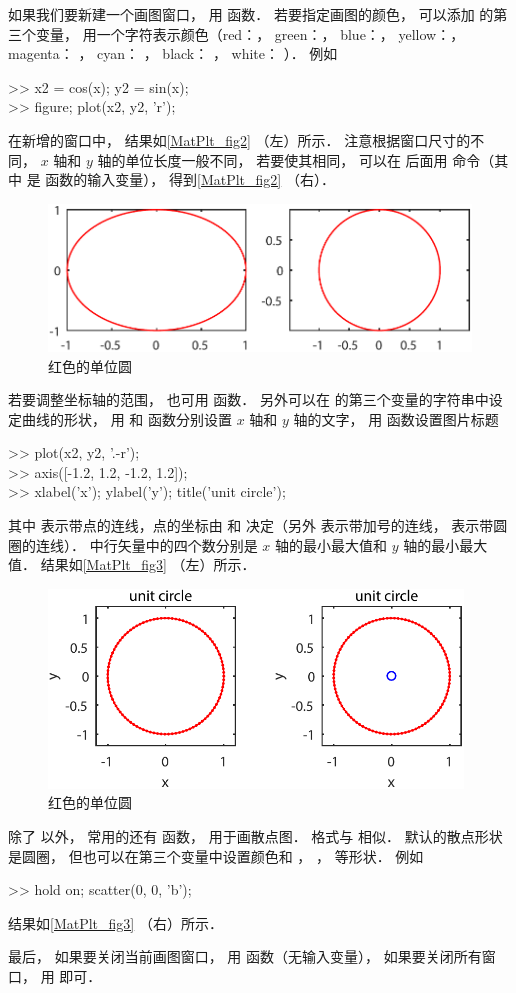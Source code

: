 如果我们要新建一个画图窗口， 用  函数． 若要指定画图的颜色， 可以添加  的第三个变量， 用一个字符表示颜色（red：， green：， blue：， yellow：， magenta： ， cyan： ， black： ， white： ）． 例如
\begin{Command}
>> x2 = cos(x); y2 = sin(x);\\
>> figure; plot(x2, y2, 'r');
\end{Command}
在新增的窗口中， 结果如\autoref{MatPlt_fig2} （左）所示． 注意根据窗口尺寸的不同， $x$ 轴和 $y$ 轴的单位长度一般不同， 若要使其相同， 可以在  后面用  命令（其中  是  函数的输入变量）， 得到\autoref{MatPlt_fig2} （右）．
\begin{figure}[ht]
\centering
\includegraphics[width=13cm]{./figures/MatPlt2.pdf}
\caption{红色的单位圆} \label{MatPlt_fig2}
\end{figure}
若要调整坐标轴的范围， 也可用  函数． 另外可以在  的第三个变量的字符串中设定曲线的形状， 用  和  函数分别设置 $x$ 轴和 $y$ 轴的文字， 用  函数设置图片标题
\begin{Command}
>> plot(x2, y2, '.-r');\\
>> axis([-1.2, 1.2, -1.2, 1.2]);\\
>> xlabel('x'); ylabel('y'); title('unit circle');
\end{Command}
其中 表示带点的连线，点的坐标由  和  决定（另外  表示带加号的连线，  表示带圆圈的连线）．  中行矢量中的四个数分别是 $x$ 轴的最小最大值和 $y$ 轴的最小最大值． 结果如\autoref{MatPlt_fig3} （左）所示．
\begin{figure}[ht]
\centering
\includegraphics[width=11cm]{./figures/MatPlt3.pdf}
\caption{红色的单位圆} \label{MatPlt_fig3}
\end{figure}

除了  以外， 常用的还有  函数， 用于画散点图． 格式与  相似． 默认的散点形状是圆圈， 但也可以在第三个变量中设置颜色和 ， ，  等形状． 例如
\begin{Command}
>> hold on; scatter(0, 0, 'b');
\end{Command}
结果如\autoref{MatPlt_fig3} （右）所示．

最后， 如果要关闭当前画图窗口， 用  函数（无输入变量）， 如果要关闭所有窗口， 用  即可．